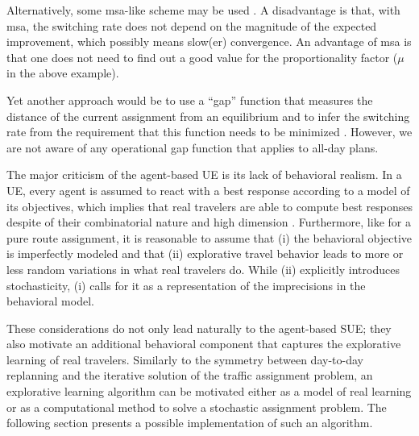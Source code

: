 Alternatively, some \gls{msa}-like scheme
may be used \citep{liu-2007}.  A disadvantage is that, with \gls{msa}, the
switching rate does not depend on the magnitude of the expected
improvement, which possibly means slow(er) convergence.  An advantage
of \gls{msa} is that one does not need to find out a good value for the
proportionality factor ($\mu$ in the above example).  

Yet another approach would be to use a ``gap'' function that measures the
distance of the current assignment from an equilibrium and to infer
the switching rate from the requirement that this function needs to
be minimized 
\citep{LuMahmassaniZhou2009GapDue,zhang-2008}.
However, we are not aware of any operational gap function that applies to all-day plans.

The major criticism of the agent-based UE is its lack of behavioral realism.
In a UE, every agent is assumed to react with a best response 
according to a model of its objectives, which implies 
that real travelers are able to compute best responses
despite of their combinatorial nature and high dimension
\citep{bowman-1998}.
Furthermore, like for a pure route assignment, it
is reasonable to assume that (i) the behavioral objective is
imperfectly modeled and that (ii) explorative travel behavior leads
to more or less random variations in what real travelers do.
While (ii) explicitly introduces stochasticity, (i) calls for it as a
representation of the imprecisions in the behavioral model.

These considerations do not only lead naturally to the agent-based SUE;
they also motivate an additional behavioral component that captures
the explorative learning of real travelers. Similarly to the symmetry
between day-to-day replanning and the iterative solution of the traffic assignment
problem, an explorative learning algorithm can be motivated either as
a model of real learning or as a computational method to solve a stochastic
assignment problem. The following section presents a possible implementation
of such an algorithm. 


